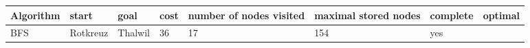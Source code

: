 \documentclass[11pt]{article}
\begin{document}
\begin{longtable}[]{@{}llllllll@{}}
\toprule
\begin{minipage}[b]{0.11\columnwidth}\raggedright
Algorithm\strut
\end{minipage} & \begin{minipage}[b]{0.11\columnwidth}\raggedright
start\strut
\end{minipage} & \begin{minipage}[b]{0.09\columnwidth}\raggedright
goal\strut
\end{minipage} & \begin{minipage}[b]{0.09\columnwidth}\raggedright
cost\strut
\end{minipage} & \begin{minipage}[b]{0.09\columnwidth}\raggedright
number of nodes visited\strut
\end{minipage} & \begin{minipage}[b]{0.09\columnwidth}\raggedright
maximal stored nodes\strut
\end{minipage} & \begin{minipage}[b]{0.09\columnwidth}\raggedright
complete\strut
\end{minipage} & \begin{minipage}[b]{0.09\columnwidth}\raggedright
optimal\strut
\end{minipage}\tabularnewline
\midrule
\endhead
\begin{minipage}[t]{0.11\columnwidth}\raggedright
BFS\strut
\end{minipage} & \begin{minipage}[t]{0.11\columnwidth}\raggedright
Rotkreuz\strut
\end{minipage} & \begin{minipage}[t]{0.09\columnwidth}\raggedright
Thalwil\strut
\end{minipage} & \begin{minipage}[t]{0.09\columnwidth}\raggedright
36\strut
\end{minipage} & \begin{minipage}[t]{0.09\columnwidth}\raggedright
17\strut
\end{minipage} & \begin{minipage}[t]{0.09\columnwidth}\raggedright
154\strut
\end{minipage} & \begin{minipage}[t]{0.09\columnwidth}\raggedright
yes\strut
\end{minipage} & \begin{minipage}[t]{0.09\columnwidth}\raggedright

\end{minipage}
\end{longtable}
\end{document}
